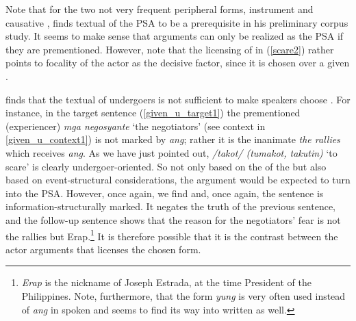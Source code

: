 \documentclass[output=paper,
,modfonts
,nonflat]{langsci/langscibook}
\begin{document}
Note that for the two not very frequent peripheral  forms, instrument  and causative , \cite{nuhpa16} finds textual  of the PSA to be a prerequisite in his preliminary corpus study. It seems to make sense that  arguments can only be realized as the PSA if they are prementioned. However, note that the licensing of  in (\ref{scare2}) rather points to focality of the actor as the decisive factor, since it is chosen over a given .

\cite{latan16a} finds that the textual  of undergoers is not sufficient to make speakers choose . For instance, in the target sentence (\ref{given_u_target1}) the prementioned  (experiencer) \textit{mga negosyante} `the negotiators' (see context in \ref{given_u_context1}) is not marked by \textit{ang}; rather it is the inanimate  \textit{the rallies} which receives \textit{ang}. As we have just pointed out, \textit{/takot/ (tumakot, takutin)} `to scare' is clearly undergoer-oriented. So not only based on the  of the  but also based on event-structural  considerations, the  argument would be expected to turn into the PSA. However, once again, we find  and, once again, the sentence is information-structurally marked. It negates the truth of the previous sentence, and the follow-up sentence shows that the reason for the negotiators’ fear is not the rallies but Erap.\footnote{\textit{Erap} is the nickname of Joseph Estrada, at the time President of the Philippines. Note, furthermore, that the form \textit{yung} is very often used instead of \textit{ang} in spoken  and seems to find its way into written  as well.} It is therefore possible that it is the contrast between the actor arguments that licenses the chosen  form.
\end{document}
